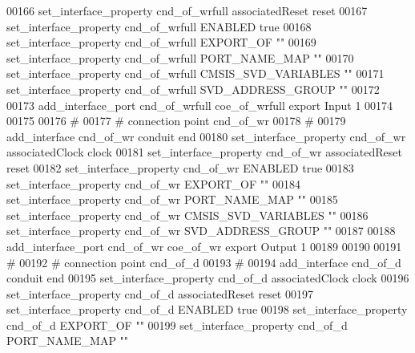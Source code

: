 \begin{DoxyCode}
00166 \textcolor{comment}{}set\_interface\_property cnd\_of\_wrfull associatedReset reset\textcolor{comment}{}
00167 \textcolor{comment}{}set\_interface\_property cnd\_of\_wrfull ENABLED true\textcolor{comment}{}
00168 \textcolor{comment}{}set\_interface\_property cnd\_of\_wrfull EXPORT\_OF ""\textcolor{comment}{}
00169 \textcolor{comment}{}set\_interface\_property cnd\_of\_wrfull PORT\_NAME\_MAP ""\textcolor{comment}{}
00170 \textcolor{comment}{}set\_interface\_property cnd\_of\_wrfull CMSIS\_SVD\_VARIABLES ""\textcolor{comment}{}
00171 \textcolor{comment}{}set\_interface\_property cnd\_of\_wrfull SVD\_ADDRESS\_GROUP ""\textcolor{comment}{}
00172 \textcolor{comment}{}
00173 add\_interface\_port cnd\_of\_wrfull coe\_of\_wrfull export Input 1\textcolor{comment}{}
00174 \textcolor{comment}{}
00175 
00176 \textcolor{comment}{# }
00177 \textcolor{comment}{}\textcolor{comment}{# connection point cnd\_of\_wr}
00178 \textcolor{comment}{}\textcolor{comment}{# }
00179 \textcolor{comment}{}add\_interface cnd\_of\_wr conduit end\textcolor{comment}{}
00180 \textcolor{comment}{}set\_interface\_property cnd\_of\_wr associatedClock clock\textcolor{comment}{}
00181 \textcolor{comment}{}set\_interface\_property cnd\_of\_wr associatedReset reset\textcolor{comment}{}
00182 \textcolor{comment}{}set\_interface\_property cnd\_of\_wr ENABLED true\textcolor{comment}{}
00183 \textcolor{comment}{}set\_interface\_property cnd\_of\_wr EXPORT\_OF ""\textcolor{comment}{}
00184 \textcolor{comment}{}set\_interface\_property cnd\_of\_wr PORT\_NAME\_MAP ""\textcolor{comment}{}
00185 \textcolor{comment}{}set\_interface\_property cnd\_of\_wr CMSIS\_SVD\_VARIABLES ""\textcolor{comment}{}
00186 \textcolor{comment}{}set\_interface\_property cnd\_of\_wr SVD\_ADDRESS\_GROUP ""\textcolor{comment}{}
00187 \textcolor{comment}{}
00188 add\_interface\_port cnd\_of\_wr coe\_of\_wr export Output 1\textcolor{comment}{}
00189 \textcolor{comment}{}
00190 
00191 \textcolor{comment}{# }
00192 \textcolor{comment}{}\textcolor{comment}{# connection point cnd\_of\_d}
00193 \textcolor{comment}{}\textcolor{comment}{# }
00194 \textcolor{comment}{}add\_interface cnd\_of\_d conduit end\textcolor{comment}{}
00195 \textcolor{comment}{}set\_interface\_property cnd\_of\_d associatedClock clock\textcolor{comment}{}
00196 \textcolor{comment}{}set\_interface\_property cnd\_of\_d associatedReset reset\textcolor{comment}{}
00197 \textcolor{comment}{}set\_interface\_property cnd\_of\_d ENABLED true\textcolor{comment}{}
00198 \textcolor{comment}{}set\_interface\_property cnd\_of\_d EXPORT\_OF ""\textcolor{comment}{}
00199 \textcolor{comment}{}set\_interface\_property cnd\_of\_d PORT\_NAME\_MAP ""\textcolor{comment}{}

\end{DoxyCode}
